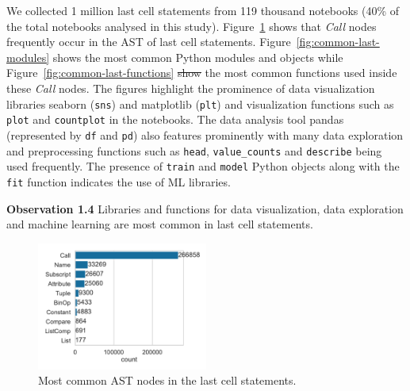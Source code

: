 \documentclass[smallextended]{svjour3}       %
\newcommand{\highlight}[1]{\begin{framed}%
  \noindent#1
\end{framed}}
\providecommand{\DIFadd}[1]{{\protect\color{blue}\uwave{#1}}} %
\providecommand{\DIFdel}[1]{{\protect\color{red}\sout{#1}}} %
\providecommand{\DIFaddbegin}{} %
\providecommand{\DIFaddend}{} %
\providecommand{\DIFdelbegin}{} %
\providecommand{\DIFdelend}{} %
\newcommand{\DIFscaledelfig}{0.5}
\newlength{\DIFdelgraphicswidth} %
\newlength{\DIFdelgraphicsheight} %
\newcommand{\DIFaddincludegraphics}[2][]{{\color{blue}\fbox{\DIFOincludegraphics[#1]{#2}}}} %
\newcommand{\DIFdelincludegraphics}[2][]{%
\sbox{\DIFdelgraphicsbox}{\DIFOincludegraphics[#1]{#2}}%
\settoboxwidth{\DIFdelgraphicswidth}{\DIFdelgraphicsbox} %
\settoboxtotalheight{\DIFdelgraphicsheight}{\DIFdelgraphicsbox} %
\scalebox{\DIFscaledelfig}{%
\parbox[b]{\DIFdelgraphicswidth}{\usebox{\DIFdelgraphicsbox}\\[-\baselineskip] \rule{\DIFdelgraphicswidth}{0em}}\llap{\resizebox{\DIFdelgraphicswidth}{\DIFdelgraphicsheight}{%
\setlength{\unitlength}{\DIFdelgraphicswidth}%
\begin{picture}(1,1)%
\thicklines\linethickness{2pt} %
{\color[rgb]{1,0,0}\put(0,0){\framebox(1,1){}}}%
{\color[rgb]{1,0,0}\put(0,0){\line( 1,1){1}}}%
{\color[rgb]{1,0,0}\put(0,1){\line(1,-1){1}}}%
\end{picture}%
}\hspace*{3pt}}} %
} %
\DeclareRobustCommand{\DIFaddbegin}{\DIFOaddbegin \let\includegraphics\DIFaddincludegraphics} %
\DeclareRobustCommand{\DIFaddend}{\DIFOaddend \let\includegraphics\DIFOincludegraphics} %
\DeclareRobustCommand{\DIFdelbegin}{\DIFOdelbegin \let\includegraphics\DIFdelincludegraphics} %
\DeclareRobustCommand{\DIFdelend}{\DIFOaddend \let\includegraphics\DIFOincludegraphics} %
\begin{document}
We collected 1 million last cell statements from 119 thousand notebooks (40\% of the total notebooks analysed in this study). Figure~\ref{fig:common-last-nodes} shows that \emph{Call} nodes frequently occur in the AST of last cell statements. Figure~\ref{fig:common-last-modules} shows the most common Python modules and objects while Figure~\ref{fig:common-last-functions} \DIFdelbegin \DIFdel{show }\DIFdelend \DIFaddbegin \DIFadd{shows }\DIFaddend the most common functions used inside these \emph{Call} nodes. The figures highlight the prominence of data visualization libraries seaborn (\lstinline{sns}) and matplotlib (\lstinline{plt}) and visualization functions such as \lstinline{plot} and \lstinline{countplot} in the notebooks. The data analysis tool pandas (represented by \lstinline{df} and \lstinline{pd}) also features prominently with many data exploration and preprocessing functions such as \lstinline{head}, \lstinline{value_counts} and \lstinline{describe} being used frequently. The presence of \lstinline{train} and \lstinline{model} Python objects along with the \lstinline{fit} function indicates the use of ML libraries.

\DIFdelbegin %
\DIFdelend \DIFaddbegin \highlight{\textbf{Observation 1.4} Libraries and functions for data visualization, data exploration and machine learning are most common in last cell statements.}
\DIFaddend 

\begin{figure}
	\centering
	\includegraphics[width=0.5\textwidth]{common-last-nodes.pdf}
	\caption{Most common AST nodes in the last cell statements.}
	\label{fig:common-last-nodes}
\end{figure}
\end{document}
